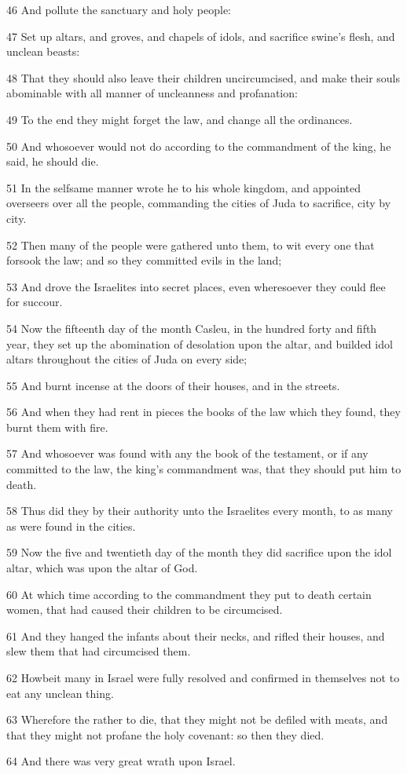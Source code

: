 \par 46 And pollute the sanctuary and holy people:
\par 47 Set up altars, and groves, and chapels of idols, and sacrifice swine's flesh, and unclean beasts:
\par 48 That they should also leave their children uncircumcised, and make their souls abominable with all manner of uncleanness and profanation:
\par 49 To the end they might forget the law, and change all the ordinances.
\par 50 And whosoever would not do according to the commandment of the king, he said, he should die.
\par 51 In the selfsame manner wrote he to his whole kingdom, and appointed overseers over all the people, commanding the cities of Juda to sacrifice, city by city.
\par 52 Then many of the people were gathered unto them, to wit every one that forsook the law; and so they committed evils in the land;
\par 53 And drove the Israelites into secret places, even wheresoever they could flee for succour.
\par 54 Now the fifteenth day of the month Casleu, in the hundred forty and fifth year, they set up the abomination of desolation upon the altar, and builded idol altars throughout the cities of Juda on every side;
\par 55 And burnt incense at the doors of their houses, and in the streets.
\par 56 And when they had rent in pieces the books of the law which they found, they burnt them with fire.
\par 57 And whosoever was found with any the book of the testament, or if any committed to the law, the king's commandment was, that they should put him to death.
\par 58 Thus did they by their authority unto the Israelites every month, to as many as were found in the cities.
\par 59 Now the five and twentieth day of the month they did sacrifice upon the idol altar, which was upon the altar of God.
\par 60 At which time according to the commandment they put to death certain women, that had caused their children to be circumcised.
\par 61 And they hanged the infants about their necks, and rifled their houses, and slew them that had circumcised them.
\par 62 Howbeit many in Israel were fully resolved and confirmed in themselves not to eat any unclean thing.
\par 63 Wherefore the rather to die, that they might not be defiled with meats, and that they might not profane the holy covenant: so then they died.
\par 64 And there was very great wrath upon Israel.

